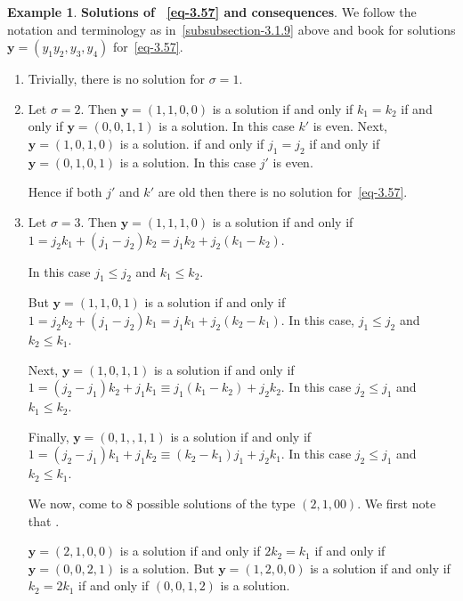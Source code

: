 \documentclass[a4paper,12pt]{article}
\theoremstyle{definition}
\theoremstyle{underlinethm}
\newtheorem{example}{Example}[section]
\theoremstyle{definition}
\begin{document}
\begin{example}\label{example-3.5}
\textbf{Solutions of ~\eqref{eq-3.57} and consequences}. We follow the notation and terminology as in~\eqref{subsubsection-3.1.9} above and book for solutions $\mathbf{y}=\left(y_{1} y_{2}, y_{3}, y_{4}\right)$ for~\eqref{eq-3.57}.
\end{example}
\begin{enumerate}[label=(\alph*)]

\item Trivially, there is no solution for $\sigma=1$.

\item Let $\sigma=2$. Then $\mathbf{y} = (1,1,0,0)$ is a solution if and only if $k_{1}=k_{2}$ if and only if $\mathbf{y}= (0,0,1,1)$ is a solution. In this case $k'$ is even. Next, $\mathbf{y} = (1,0,1,0)$ is a solution. if and only if $j_{1}=j_{2}$ if and only if $\mathbf{y}= (0,1,0,1)$ is a solution. In this case $j'$ is even.

Hence if both $j'$ and $k'$ are old then there is no solution for~\eqref{eq-3.57}.

\item Let $\sigma = 3$. Then $\mathbf{y} = (1,1,1,0)$ is a solution if and only if $1 = j_{2}k_{1} + (j_{1}-j_{2})k_{2} = j_{1}k_{2} + j_{2}(k_{1}-k_{2})$.

In this case $j_{1}\leq j_{2}$ and $k_{1} \leq k_{2}$.

But $\mathbf{y} = (1,1,0,1)$ is a solution if and only if $1=j_{2}k_{2} + (j_{1}-j_{2})k_{1}=j_{1}k_{1} + j_{2}\left(k_{2}-k_{1}\right)$. In this case, $j_{1} \leq j_{2}$ and $k_{2} \leq k_{1}$.

Next, $\mathbf{y} = (1,0,1,1)$ is a solution if and only if $1=\left(j_{2}-j_{1}\right)k_{2} + j_{1}k_{1} \equiv j_{1}(k_{1}-k_{2}) + j_{2} k_{2}$. In this case $j_{2} \leq j_{1}$ and $k_{1}\leq k_{2}$.

Finally, $\mathbf{y}=(0,1,,1,1)$ is a solution if and only if\\ $1=\left(j_{2}-j_{1}\right) k_{1} + j_{1}k_{2}\equiv \left(k_{2}-k_{1}\right)j_{1} + j_{2}k_{1} $. In this case $j_{2} \leq j_{1}$ and $k_{2}\leq k_{1}$.

We now, come to 8 possible solutions of the type $(2,1,00)$. We first note that .

$\mathbf{y}=(2,1,0,0)$ is a solution if and only if $2k_{2}=k_{1}$ if and only if $\mathbf{y}=(0,0,2,1)$ is a solution. But $\mathbf{y}=(1,2,0,0)$ is a solution if and only if $k_{2}=2k_{1}$ if and only if $(0,0,1,2)$ is a solution.


\end{enumerate}
\end{document}
